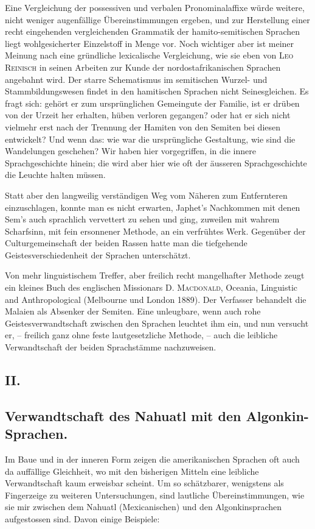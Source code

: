 Eine Vergleichung der possessiven und verbalen Pronominalaffixe würde weitere, nicht weniger augenfällige Übereinstimmungen ergeben, und zur Herstellung einer recht eingehenden vergleichenden Grammatik der hamito-semitischen Sprachen liegt wohlgesicherter Einzelstoff in Menge vor. Noch wichtiger aber ist meiner Meinung nach eine gründliche lexicalische Vergleichung, wie sie eben von \textsc{Leo Reinisch} in seinen Arbeiten zur Kunde der nordostafrikanischen Sprachen angebahnt wird. Der starre Schematismus im semitischen Wurzel- und Stammbildungswesen findet in den hamitischen Sprachen nicht Seinesgleichen. Es fragt sich: gehört er zum ursprünglichen Gemeingute der Familie, ist er drüben von der Urzeit her erhalten, hüben verloren gegangen? oder hat er sich nicht vielmehr erst nach der Trennung der Hamiten von den Semiten bei diesen entwickelt? Und wenn das: wie war die ursprüngliche Gestaltung, wie sind die Wandelungen geschehen? Wir haben hier vorgegriffen, in die innere Sprachgeschichte hinein; die wird aber hier wie oft der äusseren Sprachgeschichte die Leuchte halten müssen.

Statt aber den langweilig verständigen Weg vom Näheren zum Entfernteren einzuschlagen, konnte man es nicht erwarten, Japhet’s Nachkommen mit denen Sem’s auch sprachlich vervettert zu sehen und ging, zuweilen mit wahrem Scharfsinn, mit fein ersonnener Methode, an ein verfrühtes Werk. Gegenüber der Culturgemeinschaft der beiden Rassen hatte man die tiefgehende Geistesverschiedenheit der Sprachen unterschätzt.

Von mehr linguistischem Treffer, aber freilich recht mangelhafter Methode zeugt ein kleines Buch des englischen Missionars \textsc{D. Macdonald}, Oceania, Linguistic and Anthropological (Melbourne und London 1889). Der Verfasser behandelt die Malaien als Absenker der Semiten. Eine unleugbare, wenn auch rohe Geistesverwandtschaft zwischen den Sprachen \label{fp.173} leuchtet ihm ein, und nun versucht er, – freilich ganz ohne feste lautgesetzliche Methode, – auch die leibliche Verwandtschaft der beiden Sprachstämme nachzuweisen.

\subsection*{II.}\label{III.I.I.4.II}
\subsection*{Verwandtschaft des Nahuatl mit den Algonkin-Sprachen.}
Im Baue und in der inneren Form zeigen die amerikanischen Sprachen oft auch da auffällige Gleichheit, wo mit den bisherigen Mitteln eine leibliche Verwandtschaft kaum erweisbar scheint. Um so schätzbarer, wenigstens als Fingerzeige zu weiteren Untersuchungen, sind lautliche Übereinstimmungen, wie sie mir zwischen dem Nahuatl (Mexicanischen) und den Algonkinsprachen aufgestossen sind. Davon einige Beispiele:

